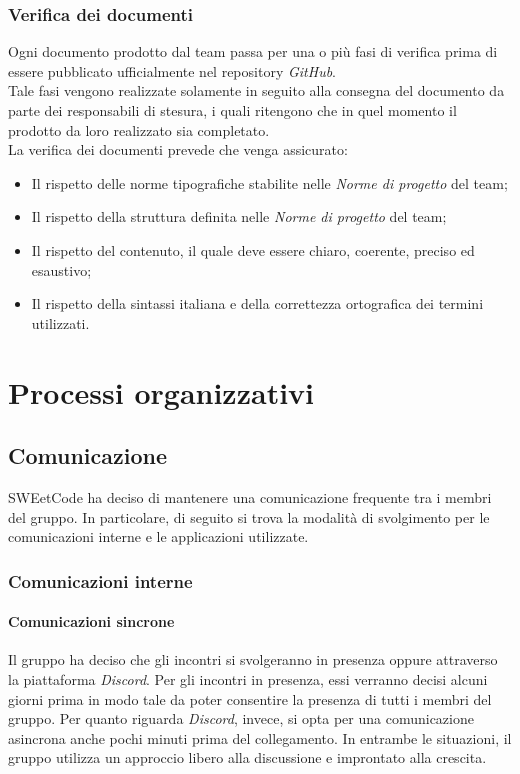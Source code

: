 \documentclass[10pt, a4paper]{article}
\begin{document}
\subsubsection{Verifica dei documenti}
Ogni documento prodotto dal team passa per una o più fasi di verifica prima di essere pubblicato ufficialmente nel repository \textit{GitHub}.\\
Tale fasi vengono realizzate solamente in seguito alla consegna del documento da parte dei responsabili di stesura, i quali ritengono che in quel momento il prodotto da loro realizzato sia completato.\\
La verifica dei documenti prevede che venga assicurato:
\begin{itemize}
    \item Il rispetto delle norme tipografiche stabilite nelle \textit{Norme di progetto} del team;
    \item Il rispetto della struttura definita nelle \textit{Norme di progetto} del team;
    \item Il rispetto del contenuto, il quale deve essere chiaro, coerente, preciso ed esaustivo;
    \item Il rispetto della sintassi italiana e della correttezza ortografica dei termini utilizzati.
\end{itemize}


\newpage
\section{Processi organizzativi}
\subsection{Comunicazione}
SWEetCode ha deciso di mantenere una comunicazione frequente tra i membri del gruppo. In particolare, di seguito si trova la modalità di svolgimento per le comunicazioni interne e le applicazioni utilizzate.
\subsubsection{Comunicazioni interne}
\paragraph{Comunicazioni sincrone}Il gruppo ha deciso che gli incontri si svolgeranno  in presenza oppure attraverso la piattaforma \textit{Discord}. Per gli incontri in presenza, essi verranno decisi alcuni giorni prima in modo tale da poter consentire la presenza di tutti i membri del gruppo. Per quanto riguarda \textit{Discord}, invece, si opta per una comunicazione asincrona anche pochi minuti prima del collegamento. In entrambe le situazioni, il gruppo utilizza un approccio libero alla discussione e improntato alla crescita.
\end{document}

